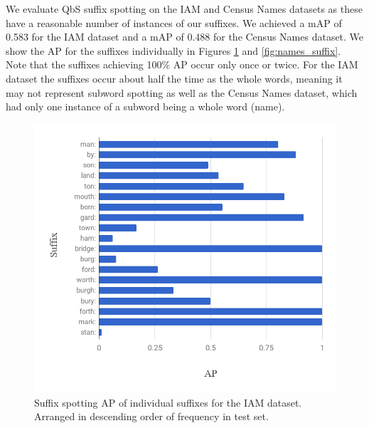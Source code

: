 \documentclass[ms,electronic,twosidetoc,letterpaper,chaptercenter,parttop,lof,lot]{byumsphd}
\begin{document}
We evaluate QbS suffix spotting on the IAM and Census Names datasets as these have a reasonable number of instances of our suffixes. We achieved a mAP of 0.583 for the IAM dataset and a mAP of 0.488 for the Census Names dataset. We show the AP for the suffixes individually in Figures \ref{fig:IAM_suffix} and \ref{fig:names_suffix}. Note that the suffixes achieving 100\% AP occur only once or twice. For the IAM dataset the suffixes occur about half the time as the whole words, meaning it may not represent subword spotting as well as the Census Names dataset, which had only one instance of a subword being a whole word (name).




\begin{figure}
    \centering
    \includegraphics[width=.75\textwidth]{suffix_IAM_ap}
    \caption{Suffix spotting AP of individual suffixes for the IAM dataset. Arranged in descending order of frequency in test set.}
    \label{fig:IAM_suffix}
\end{figure}
\end{document}

